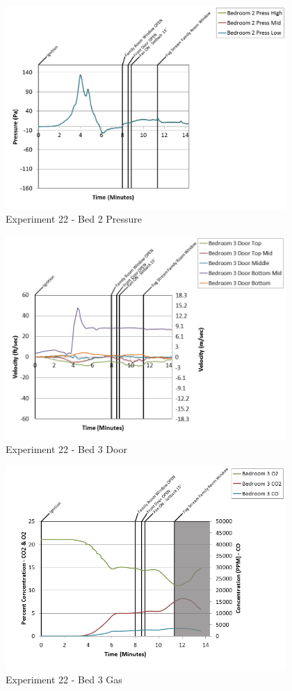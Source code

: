 \documentclass{article}
\begin{document}
\begin{appendices}
\clearpage

\begin{figure}[h!]
	\centering
	\includegraphics[height=3.05in]{0_Images/Results_Charts/Exp_22_Charts/Bed2Pressure.png}
	\caption{Experiment 22 - Bed 2 Pressure}
\end{figure}


\begin{figure}[h!]
	\centering
	\includegraphics[height=3.05in]{0_Images/Results_Charts/Exp_22_Charts/Bed3Door.png}
	\caption{Experiment 22 - Bed 3 Door}
\end{figure}

\clearpage

\begin{figure}[h!]
	\centering
	\includegraphics[height=3.05in]{0_Images/Results_Charts/Exp_22_Charts/Bed3Gas.png}
	\caption{Experiment 22 - Bed 3 Gas}
\end{figure}



\end{appendices}
\end{document}
